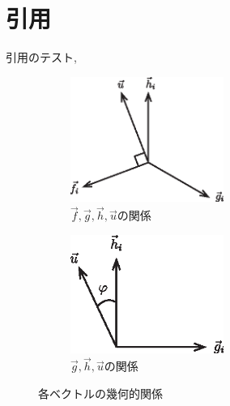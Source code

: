 \documentclass[a4paper,uplatex,dvipdfmx,ja=standard,11pt]{bxjsarticle}
\begin{document}
	\section{引用}
	引用のテスト\cite{Stevenson2012,Tsukahara2016},\cite{konoue2005,Wie2008,Isabelle,book,inproceeding,URL}
\begin{figure}[h]
	\begin{subfigure}{0.49\linewidth}
		\centering\includegraphics[width=5cm]{fig/fig1.eps}
		\caption{$\vec{f},\vec{g},\vec{h},\vec{u}$の関係}\label{fig:fig1}    %
	\end{subfigure}
	\begin{subfigure}{0.49\linewidth}
		\centering\includegraphics[width=5cm]{fig/fig2.eps}
		\caption{$\vec{g},\vec{h},\vec{u}$の関係}\label{fig:fig2}    %
	\end{subfigure}
	\caption{各ベクトルの幾何的関係}\label{fig:case4} 
\end{figure}


\end{document}

